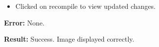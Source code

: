 \documentclass{article}
\begin{document}
\begin{itemize}
\begin{verbatim}
    \end{verbatim}
    \item Clicked on recompile to view updated changes.
\end{itemize}

\textbf{Error:} None.

\textbf{Result:} Success. Image displayed correctly.
\end{document}
